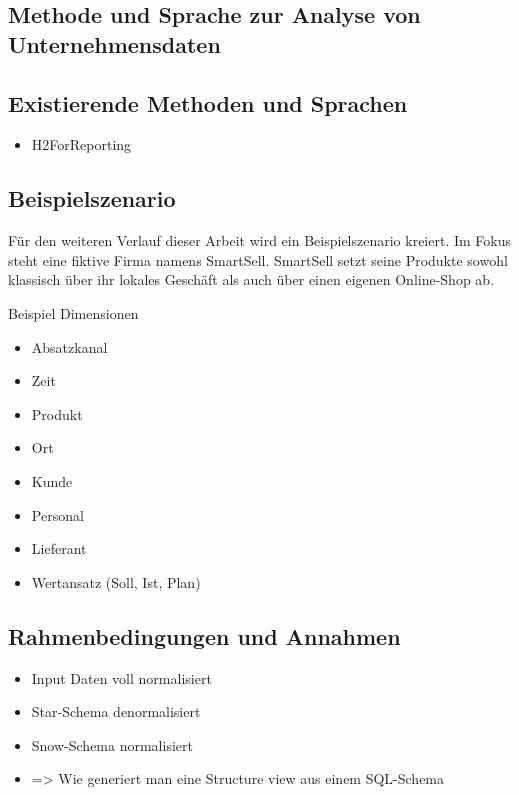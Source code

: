 \documentclass[
  language=german, %
  type=bachelor%
]{isthesis}
\begin{document}
\begin{content}
% 








  \chapter{Methode und Sprache zur Analyse von Unternehmensdaten}
  \section{Existierende Methoden und Sprachen}
  \begin{itemize}
    \item H2ForReporting
  \end{itemize}

  \section{Beispielszenario}
  Für den weiteren Verlauf dieser Arbeit wird ein Beispielszenario kreiert. Im
  Fokus steht eine fiktive Firma namens SmartSell. SmartSell setzt seine
  Produkte sowohl klassisch über ihr lokales Geschäft als auch über einen
  eigenen Online-Shop ab.

  Beispiel Dimensionen
  \begin{itemize}
    \item Absatzkanal
    \item Zeit
    \item Produkt
    \item Ort
    \item Kunde
    \item Personal
    \item Lieferant
    \item Wertansatz (Soll, Ist, Plan)
  \end{itemize}

  \section{Rahmenbedingungen und Annahmen}
  \begin{itemize}
    \item Input Daten voll normalisiert
    \item Star-Schema denormalisiert
    \item Snow-Schema normalisiert
    \item => Wie generiert man eine Structure view aus einem SQL-Schema
  \end{itemize}


\end{content}
\end{document}
